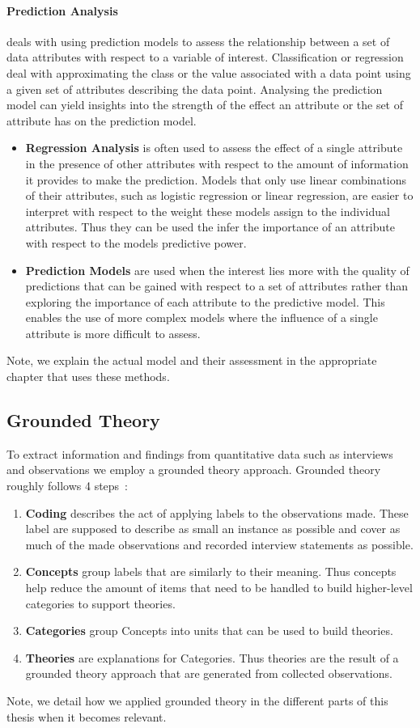 \paragraph{Prediction Analysis} deals with using prediction models to assess the relationship between a set of data attributes with respect to a variable of interest.
Classification or regression deal with approximating the class or the value associated with a data point using a given set of attributes describing the data point.
Analysing the prediction model can yield insights into the strength of the effect an attribute or the set of attribute has on the prediction model.
\begin{itemize}
\item\textbf{Regression Analysis} is often used to assess the effect of a single attribute in the presence of other attributes with respect to the amount of information it provides to make the prediction.
Models that only use linear combinations of their attributes, such as logistic regression or linear regression, are easier to interpret with respect to the weight these models assign to the individual attributes.
Thus they can be used the infer the importance of an attribute with respect to the models predictive power.
\item\textbf{Prediction Models} are used when the interest lies more with the quality of predictions that can be gained with respect to a set of attributes rather than exploring the importance of each attribute to the predictive model.
This enables the use of more complex models where the influence of a single attribute is more difficult to assess.
\end{itemize}
Note, we explain the actual model and their assessment in the appropriate chapter that uses these methods.


\subsection{Grounded Theory}
To extract information and findings from quantitative data such as interviews and observations we employ a grounded theory approach.
Grounded theory roughly follows 4 steps~\cite{strauss:sage:1994}:
 
\begin{enumerate}
\item\textbf{Coding} describes the act of applying labels to the observations made.
These label are supposed to describe as small an instance as possible and cover as much of the made observations and recorded interview statements as possible.
\item\textbf{Concepts} group labels that are similarly to their meaning.
Thus concepts help reduce the amount of items that need to be handled to build higher-level categories to support theories.
\item\textbf{Categories} group Concepts into units that can be used to build theories.
\item\textbf{Theories} are explanations for Categories.
Thus theories are the result of a grounded theory approach that are generated from collected observations.
\end{enumerate}

Note, we detail how we applied grounded theory in the different parts of this thesis when it becomes relevant.











